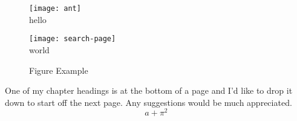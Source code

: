 \newpage

\begin{figure}
\begin{center}
\begin{minipage}[b]{2.55in}
\begin{center}
\texttt{[image: ant]}
\\hello
\end{center}
\end{minipage}
\hspace*{.375in}
\begin{minipage}[b]{2.55in}
\begin{center}
\texttt{[image: search-page]}
\\world
\end{center}
\end{minipage}
\end{center}
\caption{Figure Example}
\end{figure}


One of my chapter headings\cite{ddd} is \cite{fff} at the bottom of a page and I'd like to drop it down to start off the next page. Any suggestions would be much appreciated.
$$ a+\pi^2 \ $$
